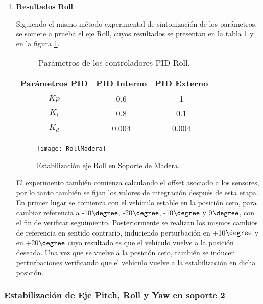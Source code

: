 \documentclass[\main/main.tex]{subfiles}
\begin{document}
\begin{enumerate}
	\item \textbf{Resultados Roll}

	Siguiendo el mismo método experimental de sintonización de los parámetros,
	se somete a prueba el eje Roll, cuyos resultados se presentan en la tabla \ref{table: Parametros Roll Ma} y en la figura \ref{fig: Resultados Roll Grafico Ma}.

	\begin{table}[H]
	\noindent \begin{centering}
	\begin{tabular}{|c|c|c|}
	\hline 
	Parámetros PID & PID Interno & PID Externo\tabularnewline
	\hline 
	\hline 
	$Kp$ & 0.6 & 1\tabularnewline
	\hline 
	$K_{i}$ & 0.8 & 0.1\tabularnewline
	\hline 
	$K_{d}$ & 0.004 & 0.004\tabularnewline
	\hline 
	\end{tabular}
	\par\end{centering}
	\caption{Parámetros de los controladores PID Roll.}\label{table: Parametros Roll Ma}\noindent
	\end{table}

	\begin{figure}[H]
	\noindent \begin{centering}
	\texttt{[image: RollMadera]}
	\par\end{centering}
	\caption{Estabilización eje Roll en Soporte de Madera.}\label{fig: Resultados Roll Grafico Ma}\noindent
	\end{figure}

	El experimento también comienza calculando el offset asociado a los
	sensores, por lo tanto también se fijan los valores de integración
	después de esta etapa. En primer lugar se comienza con el vehículo
	estable en la posición cero, para cambiar referencia a -10$\degree$, 
	-20$\degree$, -10$\degree$ y 0$\degree$,
	con el fin de verificar seguimiento. Posteriormente se realizan los
	mismos cambios de referencia en sentido contrario, induciendo perturbación
	en +10$\degree$ y en +20$\degree$ cuyo
	resultado es que el vehículo vuelve a la posición deseada. Una vez
	que se vuelve a la posición cero, también se inducen perturbaciones
	verificando que el vehículo vuelve a la estabilización en dicha posición.
\end{enumerate}

\subsubsection{Estabilización de Eje Pitch, Roll y Yaw en soporte 2}
\end{document}
